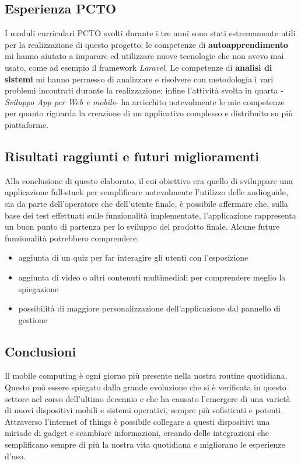\documentclass[12pt]{article}
\begin{document}
\subsection{Esperienza PCTO}
I moduli curriculari PCTO svolti durante i tre anni sono stati estremamente utili per la realizzazione di questo progetto; le competenze di \textbf{autoapprendimento} mi hanno aiutato a imparare ed utilizzare nuove tecnologie che non avevo mai usato, come ad esempio il framework \emph{Laravel}. Le competenze di \textbf{analisi di sistemi} mi hanno permesso di analizzare e risolvere con metodologia i vari problemi incontrati durante la realizzazione; infine l'attività svolta in quarta -\emph{Sviluppo App per Web e mobile}- ha arricchito notevolmente le mie competenze per quanto riguarda la creazione di un applicativo complesso e distribuito su più piattaforme.

\subsection{Risultati raggiunti e futuri miglioramenti}
Alla conclusione di questo elaborato, il cui obiettivo era quello di sviluppare una applicazione full-stack per semplificare notevolmente l'utilizzo delle audioguide, sia da parte dell'operatore che dell'utente finale, è possibile affermare che, sulla base dei test effettuati sulle funzionalità implementate, l'applicazione rappresenta un buon punto di partenza per lo sviluppo del prodotto finale. Alcune future funzionalità potrebbero comprendere:
\begin{itemize}
    \item aggiunta di un quiz per far interagire gli utenti con l'esposizione
    \item aggiunta di video o altri contenuti multimediali per comprendere meglio la spiegazione
    \item possibilità di maggiore personalizzazione dell'applicazione dal pannello di gestione
\end{itemize} 


\subsection{Conclusioni}


Il mobile computing è ogni giorno più presente nella nostra routine quotidiana. Questo può essere spiegato dalla grande evoluzione che si è verificata in questo settore nel corso dell'ultimo decennio e che ha causato l'emergere di una varietà di nuovi dispositivi mobili e sistemi operativi, sempre più sofisticati e potenti.  Attraverso l'internet of things è possibile collegare a questi dispositivi una miriade di gadget e scambiare informazioni, creando delle integrazioni che semplificano sempre di più la nostra vita quotidiana e migliorano le esperienze d'uso.

\printbibliography
\end{document}
